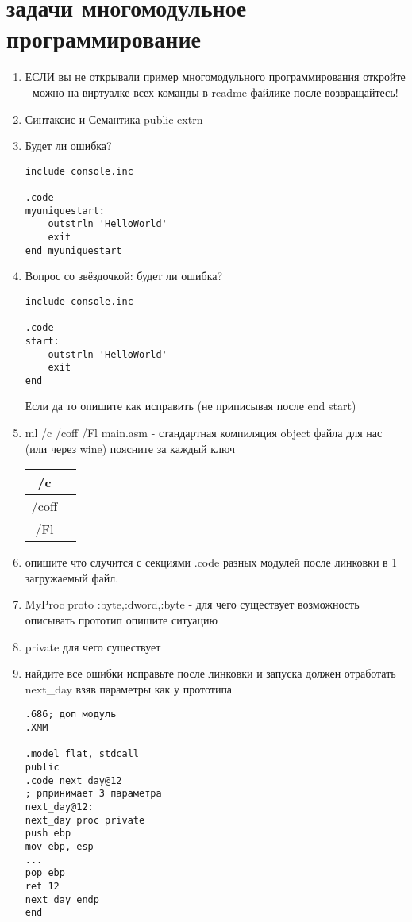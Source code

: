 \documentclass[a4paper,10pt]{article}
\begin{document}
\section*{задачи многомодульное программирование}
\begin{enumerate}
    
    \item ЕСЛИ вы не открывали пример многомодульного программирования откройте - можно на виртуалке всех команды в readme файлике после возвращайтесь!
    \item Синтаксис и Семантика public extrn
    \item Будет ли ошибка?
\begin{verbatim}
include console.inc

.code
myuniquestart: 
    outstrln 'HelloWorld'
    exit
end myuniquestart
\end{verbatim}
    \item Вопрос со звёздочкой: будет ли ошибка?
\begin{verbatim}
include console.inc

.code
start: 
    outstrln 'HelloWorld'
    exit
end
\end{verbatim}
    Если да то опишите как исправить (не приписывая после end start)
    \item ml /c /coff /Fl main.asm - стандартная компиляция object файла для нас (или через wine) поясните за каждый ключ \\
    \begin{tabular*}{15cm}{c|c}
        \hline
        /c &   \\
        \hline
        /coff & \\
        \hline
        /Fl & \\
        \hline
    \end{tabular*}
    \item опишите что случится с секциями .code разных модулей после линковки в 1 загружаемый файл.
    \item MyProc proto :byte,:dword,:byte - для чего существует возможность описывать прототип опишите ситуацию
    \item private для чего существует
    \item найдите все ошибки исправьте после линковки и запуска должен отработать next\_day взяв параметры как у прототипа
\begin{verbatim}
.686; доп модуль
.XMM

.model flat, stdcall
public 
.code next_day@12
; рпринимает 3 параметра
next_day@12:
next_day proc private
push ebp
mov ebp, esp
...
pop ebp
ret 12
next_day endp
end
\end{verbatim}



\end{enumerate}
\end{document}
